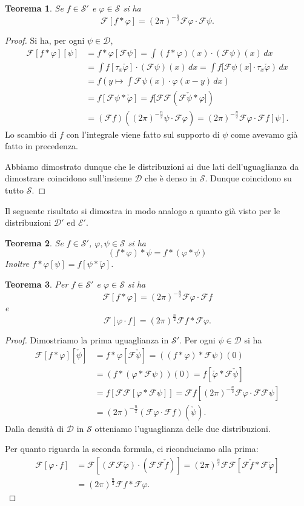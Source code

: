 \documentclass[italian,a4paper,oneside,headinclude]{scrbook}
\renewcommand{\phi}{\varphi}
\newcommand{\D}{\mathcal D}
\newcommand{\E}{\mathcal E}
\newcommand{\F}{\mathcal F}
\renewcommand{\S}{\mathcal S}
\newtheorem{theorem}{Teorema}
\begin{document}
\begin{theorem}
  Se $f\in \S'$ e $\phi\in\S$ si ha
  \[
  \F[f*\phi] = (2\pi)^{-\frac n 2} \F \phi \cdot \F \psi.
  \]
\end{theorem}
%
\begin{proof}
  Si ha, per ogni $\psi \in \D$,
  \begin{align*}
    \F[f*\phi][\psi]
    &= f*\phi[\F \psi]
    = \int (f*\phi)(x)\cdot(\F\psi)(x)\, dx \\
    &= \int f[\tau_x \check \phi]\cdot(\F\psi)(x)\, dx
    = \int f[\F\psi(x]\cdot \tau_x \check \phi)\, dx\\
    &= f\left(y\mapsto \int \F\psi(x)\cdot \phi(x-y)\, dx\right)\\
    &= f[\F\psi * \check\phi]
    = f[\F\F(\F \check \psi * \phi]) \\
    &= (\F f)((2\pi)^{-\frac n 2} \psi \cdot \F \phi)
    = (2\pi)^{-\frac n 2} \F\phi \cdot \F f[\psi].
  \end{align*}
Lo scambio di $f$ con l'integrale viene fatto sul supporto di $\psi$
come avevamo già fatto in precedenza.

Abbiamo dimostrato dunque che le distribuzioni ai due lati
dell'uguaglianza da dimostrare coincidono sull'insieme $\D$ che è
denso in $\S$. Dunque coincidono su tutto $\S$.
\end{proof}

Il seguente risultato si dimostra in modo analogo a quanto già visto
per le distribuzioni $\D'$ ed $\E'$.
\begin{theorem}
  Se $f\in \S'$, $\phi,\psi \in \S$ si ha
  \[
  (f*\phi)*\psi = f * (\phi * \psi)
  \]
  Inoltre $f*\phi[\psi] = f[\psi * \check \phi]$.
\end{theorem}

\begin{theorem}
  Per $f\in\S'$ e $\phi\in \S$ si ha
  \[
  \F[f*\phi] = (2\pi)^{-\frac n 2} \F \phi \cdot \F f
  \]
  e
  \[
  \F[\phi\cdot f] = (2\pi)^{\frac n 2} \F f * \F \phi.
  \]
\end{theorem}
%
\begin{proof}
  Dimostriamo la prima uguaglianza in $\S'$.
  Per ogni $\psi \in \D$ si ha
  \begin{align*}
    \F[f*\phi][\check \psi]
    &= f*\phi[\F \check \psi]
    = ((f*\phi)*\F \psi)(0) \\
    &= (f* (\phi*\F \psi))(0)
    = f[\check \phi * \F \check \psi] \\
    &= f[\F\F[\phi * \F \psi]]
    = \F f[(2\pi)^{-\frac n 2} \F \phi \cdot \F\F\psi] \\
    &= (2\pi)^{-\frac n 2}(\F \phi\cdot \F f)(\check \psi).
  \end{align*}
  Dalla densità di $\D$ in $\S$ otteniamo l'uguaglianza delle due
  distribuzioni.

  Per quanto riguarda la seconda formula, ci riconduciamo alla prima:
  \begin{align*}
    \F[\phi \cdot f]
    &= \F[(\F\F \check\phi) \cdot (\F\F\check f)]
    = (2\pi)^{\frac n 2} \F\F[\F\check f * \F\check \phi] \\
    &= (2\pi)^{\frac n 2} \F f * \F \phi.
  \end{align*}
\end{proof}
\end{document}
